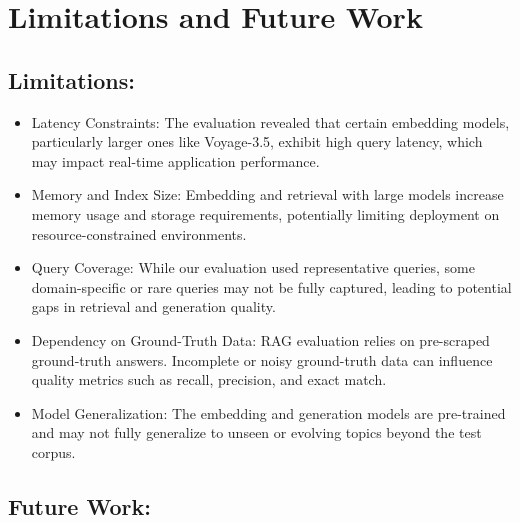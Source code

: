 \section{Limitations and Future Work}

\subsection{Limitations:}

\begin{itemize}
	\item Latency Constraints: The evaluation revealed that certain embedding models, particularly larger ones like Voyage-3.5, exhibit high query latency, which may impact real-time application performance.
	
	\item Memory and Index Size: Embedding and retrieval with large models increase memory usage and storage requirements, potentially limiting deployment on resource-constrained environments.
	
	\item Query Coverage: While our evaluation used representative queries, some domain-specific or rare queries may not be fully captured, leading to potential gaps in retrieval and generation quality.
	
	\item Dependency on Ground-Truth Data: RAG evaluation relies on pre-scraped ground-truth answers. Incomplete or noisy ground-truth data can influence quality metrics such as recall, precision, and exact match.
	
	\item Model Generalization: The embedding and generation models are pre-trained and may not fully generalize to unseen or evolving topics beyond the test corpus.
	
\end{itemize}

\subsection{Future Work:}

